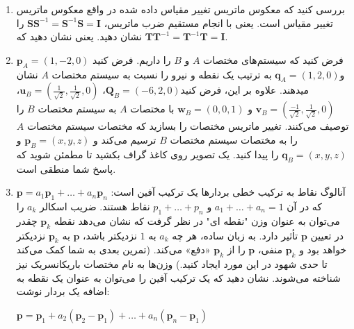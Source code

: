 {\begin{spacing}{1.5}
\begin{enumerate}[label=\textbf{\arabic*}.]
            \item {بررسی کنید که معکوس ماتریس تغییر مقیاس داده شده در واقع معکوس ماتریس تغییر مقیاس است.
            یعنی با انجام مستقیم ضرب ماتریس، $\textbf{SS}^{-1}=\textbf{S}^{-1}\textbf{S}=\textbf{I}$ را نشان دهید. یعنی نشان دهید که $\textbf{TT}^{-1}=\textbf{T}^{-1}\textbf{T}=\textbf{I}$.}

            \item {فرض کنید که سیستم‌های مختصات $A$ و $B$ را داریم.
            فرض کنید $\textbf{p}_{A}=(1,-2,0)$ و$\textbf{q}_{A}=(1,2,0)$ به ترتیب یک نقطه و نیرو را نسبت به سیستم مختصات $A$ نشان میدهند.
            علاوه بر این، فرض کنید$\textbf{Q}_{B}=(-6,2,0)$، $\textbf{u}_{B}=\left(\frac{\displaystyle 1}{\sqrt{\displaystyle 2}},\frac{\displaystyle 1}{\sqrt{\displaystyle 2}},0 \right)$، $\textbf{v}_{B}=\left(\frac{\displaystyle -1}{\sqrt{\displaystyle 2}},\frac{\displaystyle 1}{\sqrt{\displaystyle 2}},0 \right)$ و $\textbf{w}_{B}=(0,0,1)$ با مختصات $A$ به سیستم مختصات $B$ را توصیف می‌کنند.
            تغییر ماتریس مختصات را بسازید که مختصات سیستم مختصات $A$ را به مختصات سیستم مختصات $B$ ترسیم می‌کند و $\textbf{p}_{B}=(x,y,z)$ و $\textbf{q}_{B}=(x,y,z)$ را پیدا کنید.
            یک تصویر روی کاغذ گراف بکشید تا مطمئن شوید که پاسخ شما منطقی است.}

            \item {
                آنالوگ نقاط به ترکیب خطی بردارها یک ترکیب آفین است:
                $\textbf{p}=a_{1}\textbf{p}_{1}+\dots+a_{n}\textbf{p}_{n}$ که در آن $a_{1}+\dots+a_{n}=1$ و $p_{1}+\dots+p_{n}$ نقاط هستند.
                ضریب اسکالر $a_{k}$ را می‌توان به عنوان وزن "نقطه ای" در نظر گرفت
                که نشان می‌دهد نقطه $\textbf{p}_{k}$ چقدر در تعیین $\textbf{p}$ تأثیر دارد.
                به زبان ساده، هر چه $a_{k}$ به $1$ نزدیکتر باشد،
                $\textbf{p}$ به $\textbf{p}_{k}$ نزدیکتر خواهد بود و $\textbf{p}_{k}$ منفی، $\textbf{p}$ را از $\textbf{p}_{k}$ «دفع» می‌کند.
                (تمرین بعدی به شما کمک می‌کند تا حدی شهود در این مورد ایجاد کنید.) وزن‌ها به نام مختصات باریکانسریک نیز شناخته می‌شوند.
                نشان دهید که یک ترکیب آفین را می‌توان به عنوان یک نقطه به اضافه یک بردار نوشت:
                \begin{center}
                    $\textbf{p}=\textbf{p}_{1}+a_{2}(\textbf{p}_{2}-\textbf{p}_{1})+\dots+a_{n}(\textbf{p}_{n}-\textbf{p}_{1})$
                \end{center}
            }


\end{enumerate}
\end{spacing}}
